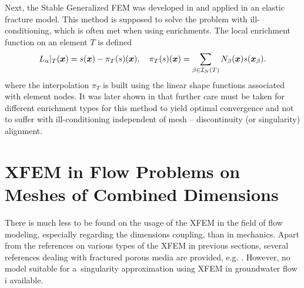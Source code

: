 Next, the Stable Generalized FEM was developed in \cite{babuska_stable_2012, gupta_stable_2013}
and applied in an elastic fracture model. This method is supposed to solve the problem with ill-conditioning,
which is often met when using enrichments. The local enrichment function on an element $T$ is defined
\begin{equation} \label{eqn:sgfem_enrich}
    L_{\alpha}|_{T}(\mathbf{\boldsymbol{x}}) = s(\mathbf{\boldsymbol{x}}) - \pi_T (s)(\mathbf{\boldsymbol{x}}),\quad \pi_T (s)(\mathbf{\boldsymbol{x}})=\sum_{\beta\in\mathcal{I}_N(T)} N_\beta(\mathbf{\boldsymbol{x}}) s(\mathbf{\boldsymbol{x}}_\beta). 
\end{equation} 
where the interpolation $\pi_T$ is built using the linear shape functions
associated with element nodes. It was later shown in \cite{zhang_robust_2016} that
further care must be taken for different enrichment types for this method to
yield optimal convergence and not to suffer with ill-conditioning independent of mesh -- discontinuity (or singularity) alignment.


\section{XFEM in Flow Problems on Meshes of Combined Dimensions} \label{sec:soa_xfem_combined}
There is much less to be found on the usage of the XFEM in the field of flow modeling, especially regarding the dimensions coupling,
than in mechanics. Apart from the references on various types of the XFEM in previous sections,
several references dealing with fractured porous media are provided, e.g. \cite{fumagalli_numerical_2012, schwenck_2015}.
However, no model suitable for a~singularity approximation using XFEM in groundwater flow i available.
